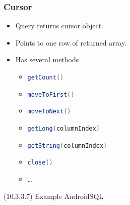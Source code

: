 \documentclass[10pt,xcolor=pdflatex]{beamer}
\newcommand{\inlinejava}{\lstinline[language={Java},basicstyle=\ttfamily,keepspaces]}
\begin{document}
\begin{frame}[fragile]\frametitle{Cursor}
\begin{itemize}
	\item Query returns cursor object.
	\item Points to one row of returned array.
	\item Has several methods
      \begin{itemize}
    	\item {\color{red}\inlinejava{getCount()}}
        \item {\color{red}\inlinejava{moveToFirst()}}
        \item {\color{red}\inlinejava{moveToNext()}}
        \item {\color{red}\inlinejava{getLong(columnIndex)}}
        \item {\color{red}\inlinejava{getString(columnIndex)}}
        \item {\color{red}\inlinejava{close()}}
        \item \ldots
      \end{itemize}
\end{itemize}
\begin{textblock}{15}(10.3,3.7)
    {\footnotesize Example AndroidSQL}
\end{textblock}
\end{frame}
\end{document}
